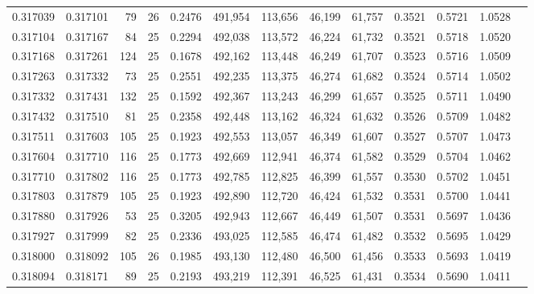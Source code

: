 \begin{tabular}{rrrrrrrrrrrrr}
0.317039 & 0.317101 &    79 &  26 &                                     0.2476 & 491,954 & 113,656 &  46,199 &  61,757 & 0.3521 & 0.5721 & 1.0528 \\
0.317104 & 0.317167 &    84 &  25 &                                     0.2294 & 492,038 & 113,572 &  46,224 &  61,732 & 0.3521 & 0.5718 & 1.0520 \\
0.317168 & 0.317261 &   124 &  25 &                                     0.1678 & 492,162 & 113,448 &  46,249 &  61,707 & 0.3523 & 0.5716 & 1.0509 \\
0.317263 & 0.317332 &    73 &  25 &                                     0.2551 & 492,235 & 113,375 &  46,274 &  61,682 & 0.3524 & 0.5714 & 1.0502 \\
0.317332 & 0.317431 &   132 &  25 &                                     0.1592 & 492,367 & 113,243 &  46,299 &  61,657 & 0.3525 & 0.5711 & 1.0490 \\
0.317432 & 0.317510 &    81 &  25 &                                     0.2358 & 492,448 & 113,162 &  46,324 &  61,632 & 0.3526 & 0.5709 & 1.0482 \\
0.317511 & 0.317603 &   105 &  25 &                                     0.1923 & 492,553 & 113,057 &  46,349 &  61,607 & 0.3527 & 0.5707 & 1.0473 \\
0.317604 & 0.317710 &   116 &  25 &                                     0.1773 & 492,669 & 112,941 &  46,374 &  61,582 & 0.3529 & 0.5704 & 1.0462 \\
0.317710 & 0.317802 &   116 &  25 &                                     0.1773 & 492,785 & 112,825 &  46,399 &  61,557 & 0.3530 & 0.5702 & 1.0451 \\
0.317803 & 0.317879 &   105 &  25 &                                     0.1923 & 492,890 & 112,720 &  46,424 &  61,532 & 0.3531 & 0.5700 & 1.0441 \\
0.317880 & 0.317926 &    53 &  25 &                                     0.3205 & 492,943 & 112,667 &  46,449 &  61,507 & 0.3531 & 0.5697 & 1.0436 \\
0.317927 & 0.317999 &    82 &  25 &                                     0.2336 & 493,025 & 112,585 &  46,474 &  61,482 & 0.3532 & 0.5695 & 1.0429 \\
0.318000 & 0.318092 &   105 &  26 &                                     0.1985 & 493,130 & 112,480 &  46,500 &  61,456 & 0.3533 & 0.5693 & 1.0419 \\
0.318094 & 0.318171 &    89 &  25 &                                     0.2193 & 493,219 & 112,391 &  46,525 &  61,431 & 0.3534 & 0.5690 & 1.0411 \\

\end{tabular}
